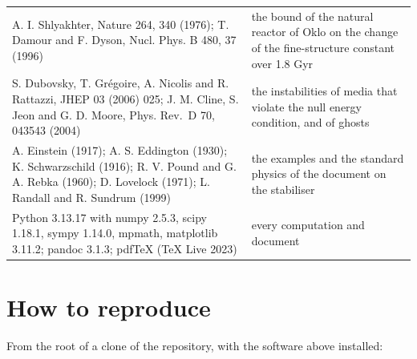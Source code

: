 \documentclass[
  10pt,
]{article}
\begin{document}
\begin{longtable}[]{@{}
  >{\raggedright\arraybackslash}p{}
  >{\raggedright\arraybackslash}p{}@{}}
A. I. Shlyakhter, Nature 264, 340 (1976); T. Damour and F. Dyson, Nucl.
Phys. B 480, 37 (1996) & the bound of the natural reactor of Oklo on the
change of the fine-structure constant over 1.8 Gyr \\
S. Dubovsky, T. Grégoire, A. Nicolis and R. Rattazzi, JHEP 03 (2006)
025; J. M. Cline, S. Jeon and G. D. Moore, Phys. Rev.~D 70, 043543
(2004) & the instabilities of media that violate the null energy
condition, and of ghosts \\
A. Einstein (1917); A. S. Eddington (1930); K. Schwarzschild (1916); R.
V. Pound and G. A. Rebka (1960); D. Lovelock (1971); L. Randall and R.
Sundrum (1999) & the examples and the standard physics of the document
on the stabiliser \\
Python 3.13.17 with numpy 2.5.3, scipy 1.18.1, sympy 1.14.0, mpmath,
matplotlib 3.11.2; pandoc 3.1.3; pdfTeX (TeX Live 2023) & every
computation and document \\
\end{longtable}

\hypertarget{how-to-reproduce}{%
\section{How to reproduce}\label{how-to-reproduce}}

From the root of a clone of the repository, with the software above
installed:
\end{document}
